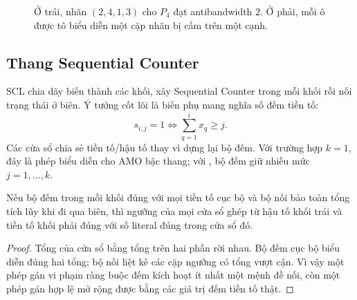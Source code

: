 \begin{figure}[tb]
\centering
{}
\caption{Ở trái, nhãn \((2,4,1,3)\) cho \(P_4\) đạt antibandwidth \(2\).
Ở phải, mỗi ô được tô biểu diễn một cặp nhãn bị cấm trên một cạnh.}
\label{fig:abp-path-conflicts}
\end{figure}

\subsection{Thang Sequential Counter}

SCL chia dãy biến thành các khối, xây Sequential Counter trong mỗi khối rồi nối
trạng thái ở biên. Ý tưởng cốt lõi là biến phụ mang nghĩa số đếm tiền tố:
\[
  s_{i,j}=1\iff
  \sum_{q=1}^{i}x_q\ge j.
\]
Các cửa sổ chia sẻ tiền tố/hậu tố thay vì dựng lại bộ đếm. Với trường hợp
\(k=1\), đây là phép biểu diễn cho AMO bậc thang; với \AMK, bộ đếm giữ nhiều mức
\(j=1,\ldots,k\).

\begin{proposition}
Nếu bộ đếm trong mỗi khối đúng với mọi tiền tố cục bộ và bộ nối bảo toàn tổng
tích lũy khi đi qua biên, thì ngưỡng của mọi cửa sổ ghép từ hậu tố khối trái
và tiền tố khối phải đúng với số literal đúng trong cửa sổ đó.
\end{proposition}

\begin{proof}
Tổng của cửa sổ bằng tổng trên hai phần rời nhau. Bộ đếm cục bộ biểu diễn đúng
hai tổng; bộ nối liệt kê các cặp ngưỡng có tổng vượt cận. Vì vậy một phép gán
vi phạm ràng buộc đếm kích hoạt ít nhất một mệnh đề nối, còn một phép gán hợp
lệ mở rộng được bằng các giá trị đếm tiền tố thật.
\end{proof}

